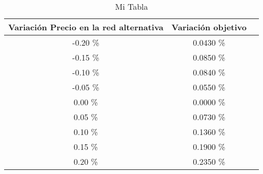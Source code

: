 \begin{table}
\centering
\begin{tabular}{|c|c|c|}
\hline
 Variación Precio en la red alternativa & Variación objetivo \\ \hline
-0.20 \% & 0.0430 \% \\ \hline
-0.15 \% & 0.0850 \% \\ \hline
-0.10 \% & 0.0840 \% \\ \hline
-0.05 \% & 0.0550 \% \\ \hline
0.00 \% & 0.0000 \% \\ \hline
0.05 \% & 0.0730 \% \\ \hline
0.10 \% & 0.1360 \% \\ \hline
0.15 \% & 0.1900 \% \\ \hline
0.20 \% & 0.2350 \% \\ \hline
\end{tabular}
\caption{Mi Tabla}
\end{table}
